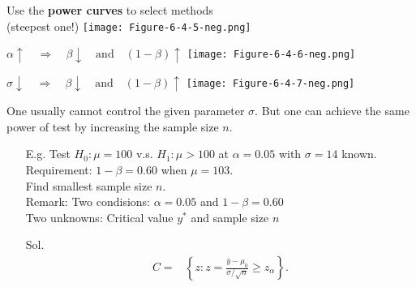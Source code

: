 \begin{frame}
 \centering
 Use the {\bf power curves} to select methods \\
 (steepest one!)
 \vfill
 \texttt{[image: Figure-6-4-5-neg.png]}
\end{frame}
\begin{frame}
 \centering
  $\alpha\uparrow \quad \Longrightarrow\quad \beta\downarrow \quad\text{and}\quad (1-\beta)\uparrow$
  \vfill
 \texttt{[image: Figure-6-4-6-neg.png]}
\end{frame}
\begin{frame}
 \centering
  $\sigma\downarrow \quad \Longrightarrow\quad \beta\downarrow \quad\text{and}\quad (1-\beta)\uparrow$
  \vfill
 \texttt{[image: Figure-6-4-7-neg.png]}
\end{frame}
\begin{frame}
 One usually cannot control the given parameter $\sigma$. But one can achieve the same power of test by increasing the sample size $n$.
 \vfill\pause
 \begin{enumerate}
  \item[E.g. ] Test $H_0:\mu=100$ v.s. $H_1:\mu>100$ at $\alpha=0.05$ with $\sigma=14$ known.\\
	  Requirement: $1-\beta = 0.60$ when $\mu=103$.\\
	  Find smallest sample size $n$. \\[1em]\pause
	  Remark: Two condisions: $\alpha=0.05$ and $1-\beta=0.60$\\
	  \hspace{4.1em}Two unknowns: Critical value $y^*$ and sample size $n$
	  \vfill
  \item[Sol.]
\begin{align*}
C=&
\left\{
z: z = \frac{\bar{y}-\mu_0}{\sigma/\sqrt{n}}\ge z_{\alpha}
\right\}.
\end{align*}
 \end{enumerate}
\end{frame}
